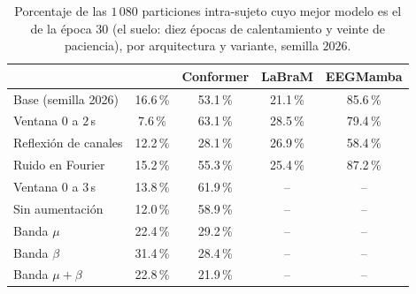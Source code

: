 \begin{table}[H]
\centering
\caption{Porcentaje de las $1\,080$ particiones intra-sujeto cuyo mejor modelo es el de la época $30$ (el
suelo: diez épocas de calentamiento y veinte de paciencia), por arquitectura y variante, semilla $2026$.}
\label{tab:parada-f4}
\small
\begin{tabular}{lcccc}
\toprule
 & \textbf{\eegnet{}} & \textbf{Conformer} & \textbf{LaBraM} & \textbf{EEGMamba} \\
\midrule
Base (semilla 2026) & 16.6\,\% & 53.1\,\% & 21.1\,\% & 85.6\,\% \\
Ventana $0$ a $2$\,s & 7.6\,\% & 63.1\,\% & 28.5\,\% & 79.4\,\% \\
Reflexión de canales & 12.2\,\% & 28.1\,\% & 26.9\,\% & 58.4\,\% \\
Ruido en Fourier & 15.2\,\% & 55.3\,\% & 25.4\,\% & 87.2\,\% \\
Ventana $0$ a $3$\,s & 13.8\,\% & 61.9\,\% & -- & -- \\
Sin aumentación & 12.0\,\% & 58.9\,\% & -- & -- \\
Banda $\mu$ & 22.4\,\% & 29.2\,\% & -- & -- \\
Banda $\beta$ & 31.4\,\% & 28.4\,\% & -- & -- \\
Banda $\mu+\beta$ & 22.8\,\% & 21.9\,\% & -- & -- \\
\bottomrule
\end{tabular}
\end{table}

